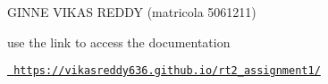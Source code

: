 G\+I\+N\+NE V\+I\+K\+AS R\+E\+D\+DY (matricola 5061211)

use the link to access the documentation

\href{https://vikasreddy636.github.io/rt2_assignment1/}{\texttt{ https\+://vikasreddy636.\+github.\+io/rt2\+\_\+assignment1/}} 
